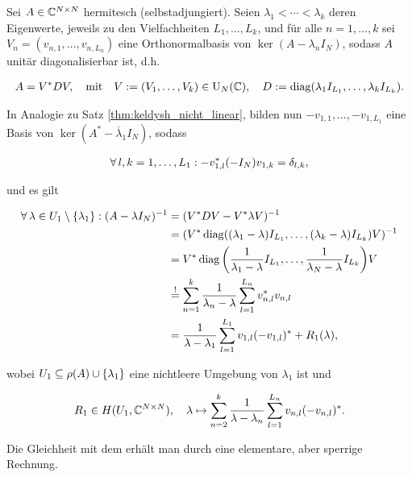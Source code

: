 \begin{remark} \label{keldysh_linear_hermitesch}

    Sei $A \in \mathbb{C}^{N \times N}$ hermitesch (selbstadjungiert).
    Seien $\lambda_1 < \cdots < \lambda_k$ deren Eigenwerte, jeweils zu den Vielfachheiten $L_1, \dots, L_k$, und für alle $n = 1, \dots, k$ sei $V_n = (v_{n, 1}, \dots, v_{n, L_n})$ eine Orthonormalbasis von $\ker (A - \lambda_n I_N)$, sodass $A$ unitär diagonalisierbar ist, d.h.

    \begin{align*}
        A = V^\ast D V,
        \quad
        \text{mit}
        \quad
        V := (V_1, \dots, V_k) \in \operatorname{U}_N(\mathbb{C}),
        \quad
        D := \operatorname{diag} (\lambda_1 I_{L_1}, \dots, \lambda_k I_{L_k}).
    \end{align*}

    In Analogie zu Satz \ref{thm:keldysh_nicht_linear}, bilden nun $-v_{1, 1}, \dots, -v_{1, L_1}$ eine Basis von $\ker (A^\ast - \overline \lambda_1 I_N)$, sodass

    \begin{align*}
        \forall \, l, k = 1, \dots, L_1:
            -v_{1, l}^\ast (-I_N) v_{1, k} = \delta_{l, k},
    \end{align*}

    und es gilt

    \begin{align*}
        \forall \, \lambda \in U_1 \setminus {\left \{ \lambda_1 \right \}}:
            (A - \lambda I_N)^{-1}
            & =
            (V^\ast D V - V^\ast \lambda V)^{-1} \\
            & =
            (V^\ast \operatorname{diag} ((\lambda_1 - \lambda) I_{L_1}, \dots, (\lambda_k - \lambda) I_{L_k}) V)^{-1} \\
            & =
            V^\ast \operatorname{diag} {\left ( \frac{1}{\lambda_1 - \lambda} I_{L_1}, \dots, \frac{1}{\lambda_N - \lambda} I_{L_k} \right )} V \\
            & \stackrel{!}{=}
            \sum_{n=1}^k
                \frac{1}{\lambda_n - \lambda}
                \sum_{l=1}^{L_n}
                    v_{n, l}^\ast v_{n, l} \\
            & =
            \frac{1}{\lambda - \lambda_1}
            \sum_{l=1}^{L_1}
                v_{1, l} (-v_{1, l})^\ast
            +
            R_1(\lambda),
    \end{align*}

    wobei $U_1 \subseteq \rho(A) \cup {\left \{ \lambda_1 \right \}}$ eine nichtleere Umgebung von $\lambda_1$ ist und

    \begin{align*}
        R_1 \in H(U_1, \mathbb{C}^{N \times N}),
        \quad
        \lambda
        \mapsto
        \sum_{n=2}^k
            \frac{1}{\lambda - \lambda_n}
            \sum_{l=1}^{L_n}
                v_{n, l} (-v_{n, l})^\ast.
    \end{align*}

    Die Gleichheit mit dem \Quote{!} erhält man durch eine elementare, aber sperrige Rechnung.

\end{remark}
